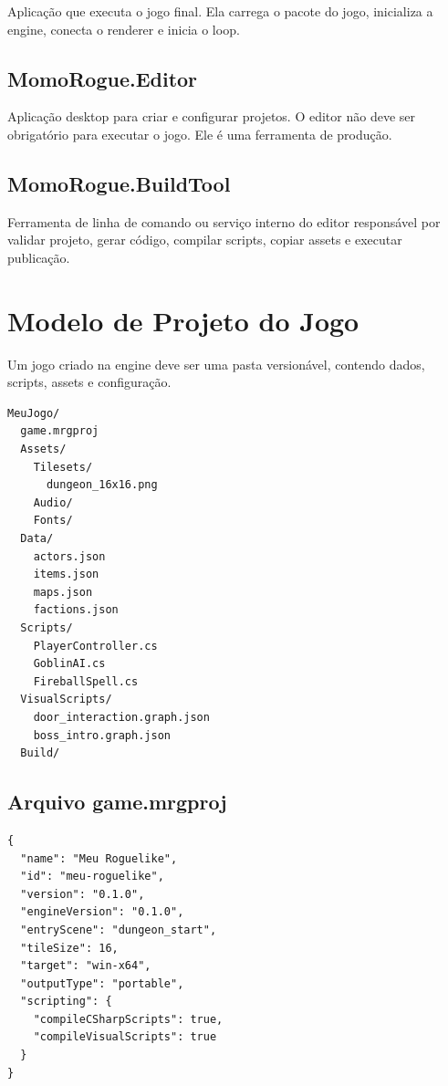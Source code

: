 \documentclass[12pt,a4paper]{article}
\begin{document}
Aplicação que executa o jogo final. Ela carrega o pacote do jogo, inicializa a engine, conecta o renderer e inicia o loop.

\subsection{MomoRogue.Editor}

Aplicação desktop para criar e configurar projetos. O editor não deve ser obrigatório para executar o jogo. Ele é uma ferramenta de produção.

\subsection{MomoRogue.BuildTool}

Ferramenta de linha de comando ou serviço interno do editor responsável por validar projeto, gerar código, compilar scripts, copiar assets e executar publicação.

\section{Modelo de Projeto do Jogo}

Um jogo criado na engine deve ser uma pasta versionável, contendo dados, scripts, assets e configuração.

\begin{lstlisting}[language={},caption={Estrutura de um projeto de jogo.}]
MeuJogo/
  game.mrgproj
  Assets/
    Tilesets/
      dungeon_16x16.png
    Audio/
    Fonts/
  Data/
    actors.json
    items.json
    maps.json
    factions.json
  Scripts/
    PlayerController.cs
    GoblinAI.cs
    FireballSpell.cs
  VisualScripts/
    door_interaction.graph.json
    boss_intro.graph.json
  Build/
\end{lstlisting}

\subsection{Arquivo game.mrgproj}

\begin{lstlisting}[language={},caption={Exemplo de configuração do projeto.}]
{
  "name": "Meu Roguelike",
  "id": "meu-roguelike",
  "version": "0.1.0",
  "engineVersion": "0.1.0",
  "entryScene": "dungeon_start",
  "tileSize": 16,
  "target": "win-x64",
  "outputType": "portable",
  "scripting": {
    "compileCSharpScripts": true,
    "compileVisualScripts": true
  }
}
\end{lstlisting}
\end{document}
